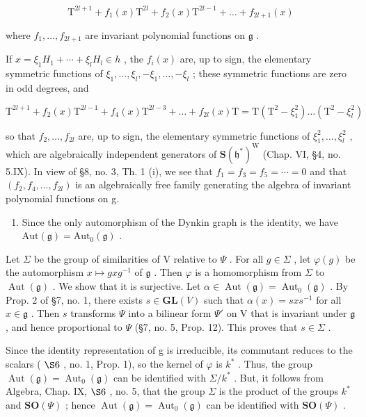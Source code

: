 \[
\mathrm{T} ^ {2 l + 1} + f _ {1} (x) \mathrm{T} ^ {2 l} + f _ {2} (x) \mathrm{T} ^ {2 l - 1} + \dots + f _ {2 l + 1} (x)
\]

where \(f_{1},\ldots ,f_{2l + 1}\) are invariant polynomial functions on \(\mathfrak{g}\) .

If \(x = \xi_{1}H_{1} + \cdots + \xi_{l}H_{l} \in h\) , the \(f_{i}(x)\) are, up to sign, the elementary symmetric functions of \(\xi_{1}, \ldots, \xi_{l}, -\xi_{1}, \ldots, -\xi_{l}\) ; these symmetric functions are zero in odd degrees, and

\[
\mathrm{T} ^ {2 l + 1} + f _ {2} (x) \mathrm{T} ^ {2 l - 1} + f _ {4} (x) \mathrm{T} ^ {2 l - 3} + \dots + f _ {2 l} (x) \mathrm{T} = \mathrm{T} (\mathrm{T} ^ {2} - \xi_ {1} ^ {2}) \dots (\mathrm{T} ^ {2} - \xi_ {l} ^ {2})
\]

so that \(f_{2},\ldots,f_{2l}\) are, up to sign, the elementary symmetric functions of \(\xi_{1}^{2},\ldots,\xi_{l}^{2}\) , which are algebraically independent generators of \(\mathbf{S}(\mathfrak{h}^{*})^{\mathrm{W}}\) (Chap. VI, §4, no. 5.IX). In view of §8, no. 3, Th. 1 (i), we see that \(f_{1}=f_{3}=f_{5}=\cdots=0\) and that \((f_{2},f_{4},\ldots,f_{2l})\) is an algebraically free family generating the algebra of invariant polynomial functions on g.

\begin{enumerate}
\def\labelenumi{(\Roman{enumi})}
\setcounter{enumi}{6}
\tightlist
\item
  Since the only automorphism of the Dynkin graph is the identity, we have \(\mathrm{Aut}(\mathfrak{g}) = \mathrm{Aut}_0(\mathfrak{g})\) .
\end{enumerate}

Let \(\Sigma\) be the group of similarities of V relative to \(\Psi\) . For all \(g \in \Sigma\) , let \(\varphi(g)\) be the automorphism \(x \mapsto gxg^{-1}\) of \(\mathfrak{g}\) . Then \(\varphi\) is a homomorphism from \(\Sigma\) to \(\operatorname{Aut}(\mathfrak{g})\) . We show that it is surjective. Let \(\alpha \in \operatorname{Aut}(\mathfrak{g}) = \operatorname{Aut}_0(\mathfrak{g})\) . By Prop. 2 of §7, no. 1, there exists \(s \in \mathbf{GL}(V)\) such that \(\alpha(x) = sxs^{-1}\) for all \(x \in \mathfrak{g}\) . Then \(s\) transforms \(\Psi\) into a bilinear form \(\Psi'\) on V that is invariant under \(\mathfrak{g}\) , and hence proportional to \(\Psi\) (§7, no. 5, Prop. 12). This proves that \(s \in \Sigma\) .

Since the identity representation of g is irreducible, its commutant reduces to the scalars ( \(\S6\) , no. 1, Prop. 1), so the kernel of \(\varphi\) is \(k^{*}\) . Thus, the group \(\operatorname{Aut}(\mathfrak{g}) = \operatorname{Aut}_{0}(\mathfrak{g})\) can be identified with \(\Sigma/k^{*}\) . But, it follows from Algebra, Chap. IX, \(\S6\) , no. 5, that the group \(\Sigma\) is the product of the groups \(k^{*}\) and \(\mathbf{SO}(\Psi)\) ; hence \(\operatorname{Aut}(\mathfrak{g}) = \operatorname{Aut}_{0}(\mathfrak{g})\) can be identified with \(\mathbf{SO}(\Psi)\) .

